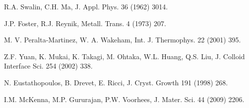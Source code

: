 \documentclass[10pt,a4paper]{article}
\begin{document}
\begin{thebibliography}{00}
 R.A. Swalin, C.H. Ma, J. Appl. Phys. 36 (1962) 3014.  

 J.P. Foster, R.J. Reynik, Metall. Trans. 4 (1973) 207. 

 M. V. Peralta-Martinez, W. A. Wakeham, Int. J. Thermophys. 22 (2001) 395.

 Z.F. Yuan, K. Mukai, K. Takagi, M. Ohtaka, W.L. Huang, Q.S. Liu, J. Colloid Interface Sci. 254 (2002) 338. 

 N. Eustathopoulos, B. Drevet, E. Ricci, J. Cryst. Growth 191 (1998) 268.

 I.M. McKenna, M.P. Gururajan, P.W. Voorhees, J. Mater. Sci. 44 (2009) 2206. 

\end{thebibliography}
\end{document}
